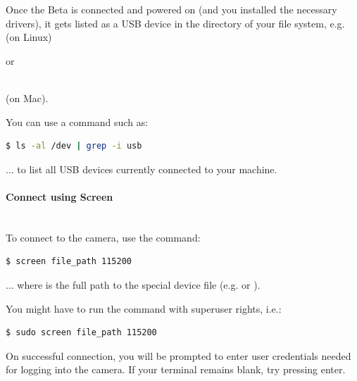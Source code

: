 Once the Beta is connected and powered on (and you installed the necessary drivers), it gets listed as a USB device in the  directory of your file system, e.g.\\

 (on Linux)

or

\\

 (on Mac).

You can use a command such as: 

\begin{lstlisting}[language=bash,morekeywords=$,keywordstyle=\bfseries,frame=none,xleftmargin=.25in,belowskip=2em, aboveskip=2em]
$ ls -al /dev | grep -i usb
\end{lstlisting}

... to list all USB devices currently connected to your machine. 



\paragraph{Connect using Screen}\\

To connect to the camera, use the command: 

\begin{lstlisting}[language=bash,morekeywords=$,keywordstyle=\bfseries,frame=none,xleftmargin=.25in,belowskip=2em, aboveskip=2em]
$ screen file_path 115200
\end{lstlisting}

... where  is the full path to the special device file (e.g.  or ).

You might have to run the command with superuser rights, i.e.: 

\begin{lstlisting}[language=bash,morekeywords=$,keywordstyle=\bfseries,frame=none,xleftmargin=.25in,belowskip=2em, aboveskip=2em]
$ sudo screen file_path 115200
\end{lstlisting}

On successful connection, you will be prompted to enter user credentials needed for logging into the camera.
If your terminal remains blank, try pressing enter.\\

